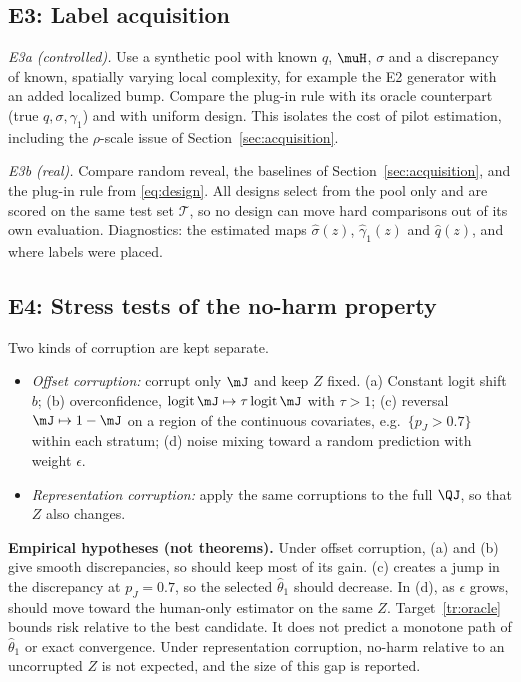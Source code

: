 \subsection{E3: Label acquisition}

\emph{E3a (controlled).} Use a synthetic pool with known $q$, $\muH$, $\sigma$ and a discrepancy of
known, spatially varying local complexity, for example the E2 generator with an added localized
bump. Compare the plug-in rule with its oracle counterpart (true $q,\sigma,\gamma_1$) and with
uniform design. This isolates the cost of pilot estimation, including the $\rho$-scale issue of
Section~\ref{sec:acquisition}.

\emph{E3b (real).} Compare random reveal, the baselines of Section~\ref{sec:acquisition}, and the
plug-in rule from \eqref{eq:design}. All designs select from the pool only and are scored on the same test set
$\mathcal T$, so no design can move hard comparisons out of its own evaluation. Diagnostics: the
estimated maps $\hat\sigma(z)$, $\hat\gamma_1(z)$ and $\hat q(z)$, and where labels were placed.

\subsection{E4: Stress tests of the no-harm property}

Two kinds of corruption are kept separate.
\begin{itemize}
  \item \emph{Offset corruption:} corrupt only $\mJ$ and keep $Z$ fixed. (a) Constant logit shift
        $b$; (b) overconfidence, $\operatorname{logit}\mJ\mapsto\tau\operatorname{logit}\mJ$ with
        $\tau>1$; (c) reversal $\mJ\mapsto1-\mJ$ on a region of the continuous covariates, e.g.\
        $\{p_J>0.7\}$ within each stratum; (d) noise
        mixing toward a random prediction with weight $\epsilon$.
  \item \emph{Representation corruption:} apply the same corruptions to the full $\QJ$, so that $Z$
        also changes.
\end{itemize}
\textbf{Empirical hypotheses (not theorems).} Under offset corruption, (a) and (b) give smooth
discrepancies, so \dfsp{} should keep most of its gain. (c) creates a jump in the discrepancy at
$p_J=0.7$, so the selected $\hat\theta_1$ should decrease. In (d), as $\epsilon$ grows, \dfsp{} should
move toward the human-only estimator on the same $Z$. Target~\ref{tr:oracle} bounds risk relative to
the best candidate. It does not predict a monotone path of $\hat\theta_1$ or exact convergence. Under
representation corruption, no-harm relative to an uncorrupted $Z$ is not expected, and the size of
this gap is reported.

